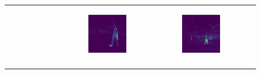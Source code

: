 \begin{figure}
\begin{tabular}{r p{\horspace} p{\horspace} p{\horspace}}
\begin{subfigure}[b]{\subfigwidth}
    \end{subfigure}
    \hfill &
    \begin{subfigure}[b]{\subfigwidth}
        \includegraphics[width=\subfigwidth]{images/vit_attention/2/attn-head5.png}
    \end{subfigure} 
    \hfill &
    \begin{subfigure}[b]{\subfigwidth}
        \includegraphics[width=\subfigwidth]{images/vit_attention/4/attn-head5.png}
    \end{subfigure} \\
\label{fig:attention_maps}
\end{tabular}
\end{figure}

